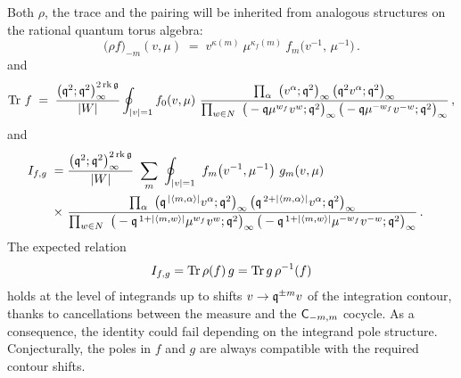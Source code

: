 \documentclass[12pt]{amsart}
\begin{document}
Both $\rho$, the trace and the pairing will be inherited from analogous structures on the rational quantum torus algebra:
\begin{equation}\label{eq:rhotorus}
	\big(\rho f\big)_{-m}(v,\mu) \;=\;
	v^{\kappa(m)}\ \mu^{\kappa_f(m)}\ f_m\big(v^{-1},\,\mu^{-1}\big) \,.
\end{equation}
and 
\begin{equation}\label{eq:measure}
	\operatorname{Tr}\, f \;=\; \frac{\big(\mathfrak{q}^2;\mathfrak{q}^2\big)_\infty^{2\,\mathrm{rk}\,\mathfrak{g}}}{|W|}
	\oint_{|v|=1} f_0(v,\mu)\
	\frac{\prod_{\alpha}\ \big(v^{\alpha};\mathfrak{q}^2\big)_\infty\,
	                      \big(\mathfrak{q}^{2}v^{\alpha};\mathfrak{q}^2\big)_\infty}
	     {\prod_{w\in N}\ \big(-\mathfrak{q}\mu^{w_f} v^{w};\mathfrak{q}^2\big)_\infty\,
	                      \big(-\mathfrak{q}\mu^{-w_f}v^{-w};\mathfrak{q}^2\big)_\infty} \,,
\end{equation}
and  
\begin{align}\label{eq:Iexplicit}
	I_{f,g} \;=\; &
	\frac{\big(\mathfrak{q}^2;\mathfrak{q}^2\big)_\infty^{2\,\mathrm{rk}\,\mathfrak{g}}}{|W|}
	\ \sum_{m}\ \oint_{|v|=1}\ f_m\big(v^{-1},\mu^{-1}\big)\ g_m(v,\mu) \cr
	\times\ &\frac{\prod_{\alpha}\
	   \big(\mathfrak{q}^{\,|\langle m,\alpha\rangle|}v^{\alpha};\mathfrak{q}^2\big)_\infty\,
	   \big(\mathfrak{q}^{\,2+|\langle m,\alpha\rangle|}v^{\alpha};\mathfrak{q}^2\big)_\infty}
	  {\prod_{w\in N}\
	   \big(-\mathfrak{q}^{\,1+|\langle m,w\rangle|}\mu^{w_f} v^{w};\mathfrak{q}^2\big)_\infty\,
	   \big(-\mathfrak{q}^{\,1+|\langle m,w\rangle|}\mu^{-w_f} v^{-w};\mathfrak{q}^2\big)_\infty} \,.
\end{align}
The expected relation 
\begin{equation}
 I_{f,g} = \operatorname{Tr} \rho(f) \,g = \operatorname{Tr} g \,\rho^{-1}(f) 
\end{equation}
holds at the level of integrands up to shifts $v \to \mathfrak{q}^{\pm m} v$ of the integration contour, thanks to cancellations between the measure and 
the $\mathsf{C}_{-m,m}$ cocycle. As a consequence, the identity could fail 
depending on the integrand pole structure. Conjecturally, the poles in $f$ and $g$ are always compatible with the required contour shifts.
\end{document}
